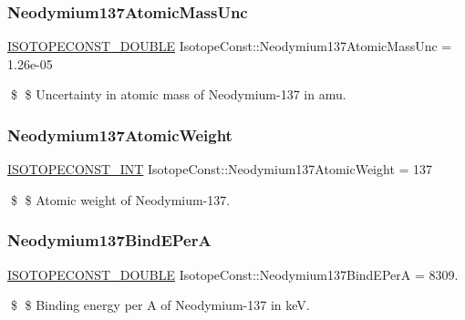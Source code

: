 \subsubsection{\texorpdfstring{Neodymium137\+Atomic\+Mass\+Unc}{Neodymium137AtomicMassUnc}}
{\footnotesize\ttfamily \mbox{\hyperlink{group___isotope_const-_macros_ga8f45a7272ce02c0b4c65c44636ed719a}{I\+S\+O\+T\+O\+P\+E\+C\+O\+N\+S\+T\+\_\+\+D\+O\+U\+B\+LE}} Isotope\+Const\+::\+Neodymium137\+Atomic\+Mass\+Unc = 1.\+26e-\/05}

\$ \$ Uncertainty in atomic mass of Neodymium-\/137 in amu. \mbox{\label{group___isotope_const-_neodymium-_nd137_ga657e8d2d50c54d2628061644e486ad9d}} 
\subsubsection{\texorpdfstring{Neodymium137\+Atomic\+Weight}{Neodymium137AtomicWeight}}
{\footnotesize\ttfamily \mbox{\hyperlink{group___isotope_const-_macros_ga5f18360b3e99483a35c32d789e62621c}{I\+S\+O\+T\+O\+P\+E\+C\+O\+N\+S\+T\+\_\+\+I\+NT}} Isotope\+Const\+::\+Neodymium137\+Atomic\+Weight = 137}

\$ \$ Atomic weight of Neodymium-\/137. \mbox{\label{group___isotope_const-_neodymium-_nd137_ga75179a3e0235eed3de1d8f2aa39697d8}} 
\subsubsection{\texorpdfstring{Neodymium137\+Bind\+E\+PerA}{Neodymium137BindEPerA}}
{\footnotesize\ttfamily \mbox{\hyperlink{group___isotope_const-_macros_ga8f45a7272ce02c0b4c65c44636ed719a}{I\+S\+O\+T\+O\+P\+E\+C\+O\+N\+S\+T\+\_\+\+D\+O\+U\+B\+LE}} Isotope\+Const\+::\+Neodymium137\+Bind\+E\+PerA = 8309.}

\$ \$ Binding energy per A of Neodymium-\/137 in keV. \mbox{\label{group___isotope_const-_neodymium-_nd137_ga958802941b7a03606c2727c97d9eae0d}} 
